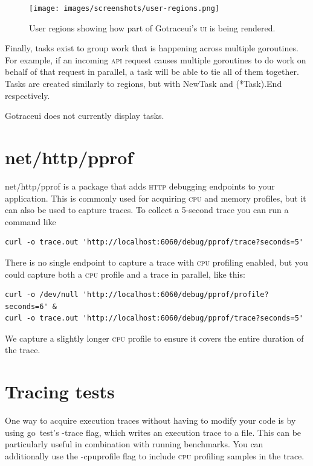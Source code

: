 \documentclass[10pt,letterpaper,oneside,openany,english]{memoir}
\newcommand{\code}[1]{{\ttfamily\mbox{#1}}}
\begin{document}
\begin{figure}[h]
  \centering
  \texttt{[image: images/screenshots/user-regions.png]}
  \caption{User regions showing how part of Gotraceui's \textsc{ui} is being rendered.}
\end{figure}

Finally, tasks exist to group work that is happening across multiple goroutines.
For example, if an incoming \textsc{api} request causes multiple goroutines to do work on behalf of that request in parallel, a task will be able to tie all of them together.
Tasks are created similarly to regions, but with \code{NewTask} and \code{(*Task).End} respectively.

Gotraceui does not currently display tasks.

\section{\code{net/http/pprof}}\label{net-http-pprof}

\code{net/http/pprof} is a package that adds \textsc{http} debugging endpoints to your application.
This is commonly used for acquiring \textsc{cpu} and memory profiles, but it can also be used to capture traces.
To collect a 5-second trace you can run a command like

\begin{verbatim}
curl -o trace.out 'http://localhost:6060/debug/pprof/trace?seconds=5'
\end{verbatim}

There is no single endpoint to capture a trace with \textsc{cpu} profiling enabled, but you could capture both a \textsc{cpu} profile and a trace in parallel, like this:

\begin{verbatim}
curl -o /dev/null 'http://localhost:6060/debug/pprof/profile?seconds=6' &
curl -o trace.out 'http://localhost:6060/debug/pprof/trace?seconds=5'
\end{verbatim}

We capture a slightly longer \textsc{cpu} profile to ensure it covers the entire duration of the trace.

\section{Tracing tests}

One way to acquire execution traces without having to modify your code is by using \code{go test}'s \code{-trace} flag, which writes an execution trace to a file.
This can be particularly useful in combination with running benchmarks.
You can additionally use the \code{-cpuprofile} flag to include \textsc{cpu} profiling samples in the trace.
\end{document}
